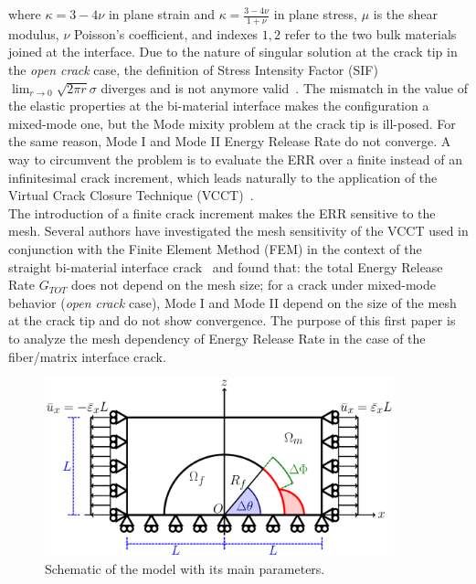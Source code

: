 where $\kappa=3-4\nu$ in plane strain and $\kappa=\frac{3-4\nu}{1+\nu}$ in plane stress, $\mu$ is the shear modulus, $\nu$ Poisson's coefficient, and indexes $1,2$ refer to the two bulk materials joined at the interface. Due to the nature of singular solution at the crack tip in the \emph{open crack} case, the definition of Stress Intensity Factor (SIF) $\lim_{r\rightarrow 0}\sqrt{2\pi r}\sigma$ diverges and is not anymore valid~\cite{Comninou1990}. The mismatch in the value of the elastic properties at the bi-material interface makes the configuration a mixed-mode one, but the Mode mixity problem at the crack tip is ill-posed. For the same reason, Mode I and Mode II Energy Release Rate do not converge. A way to circumvent the problem is to evaluate the ERR over a finite instead of an infinitesimal crack increment, which leads naturally to the application of the Virtual Crack Closure Technique (VCCT)~\cite{Rybicki1977,Krueger2004}.\\
The introduction of a finite crack increment makes the ERR sensitive to the mesh. Several authors have investigated the mesh sensitivity of the VCCT used in conjunction with the Finite Element Method (FEM) in the context of the straight bi-material interface crack~\cite{Krueger2013,Sun1987,Sun1989,Manoharan1990,Raju1988,Agrawal2006,Wang2013} and found that: the total Energy Release Rate $G_{TOT}$ does not depend on the mesh size; for a crack under mixed-mode behavior (\emph{open crack} case), Mode I and Mode II depend on the size of the mesh at the crack tip and do not show convergence. The purpose of this first paper is to analyze the mesh dependency of Energy Release Rate in the case of the fiber/matrix interface crack.

\begin{figure}[!h]
\centering
\includegraphics[width=0.9\textwidth]{paperA/RUC.pdf}
\caption{Schematic of the model with its main parameters.}\label{chap3:paperA:fig:modelschem}
\end{figure}

